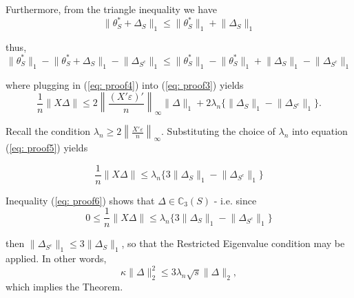 \documentclass[10pt,handout,english]{beamer}
\newcommand{\C}{\mathbb{C}}
\begin{document}
\begin{frame}[allowframebreaks]
Furthermore, from the triangle inequality we have
\[
\lVert\theta_S^*+\Delta_S\rVert_1\leq \lVert\theta_S^*\rVert_1+\lVert\Delta_S\rVert_1 
\]

thus,
\begin{equation}\label{eq: proof4}
\lVert\theta_S^*\rVert_1-\lVert\theta_S^*+\Delta_S\rVert_1-\lVert\Delta_{S^c}\rVert_1\leq \lVert\theta_S^*\rVert_1-\lVert\theta_S^*\rVert_1+\lVert\Delta_S\rVert_1-\lVert\Delta_{S^c}\rVert_1
\end{equation}

where plugging in (\ref{eq: proof4}) into (\ref{eq: proof3}) yields
\begin{equation}\label{eq: proof5}
\frac{1}{n}\lVert X\Delta\rVert\leq2\left\lVert\frac{(X'\varepsilon)'}{n}\right\rVert_{\infty}\lVert\Delta\rVert_1+2\lambda_n\{\lVert\Delta_S\rVert_1-\lVert\Delta_{S^c}\rVert_1\}.
\end{equation}

Recall the condition $\lambda_n\geq 2\left\lVert\frac{X'\varepsilon}{n}\right\rVert_{\infty}$. Substituting the choice of $\lambda_n$ into equation (\ref{eq: proof5}) yields

\begin{equation}\label{eq: proof6}
\frac{1}{n}\lVert X\Delta\rVert\leq \lambda_n\{3\lVert\Delta_S\rVert_1-\lVert\Delta_{S^c}\rVert_1\}
\end{equation}

Inequality (\ref{eq: proof6}) shows that $\Delta\in\C_3(S)$ - i.e. since
\[
0\leq\frac{1}{n}\lVert X\Delta\rVert\leq\lambda_n\{3\lVert\Delta_S\rVert_1-\lVert\Delta_{S^c}\rVert_1\}
\]

then $\lVert\Delta_{S^c}\rVert_1\leq 3\lVert\Delta_S\rVert_1$, so that the Restricted Eigenvalue condition may be applied. In other words,
\[
\kappa\lVert\Delta\rVert_2^2\leq 3\lambda_n\sqrt{s}\lVert\Delta\rVert_2,
\]
which implies the Theorem.
\end{frame}
\end{document}
